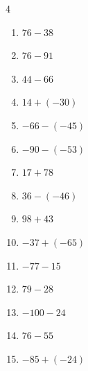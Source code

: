 \begin{multicols}{4}
\begin{enumerate}
        \phantom{$=54$}

  \item $76-38$

        \phantom{$=38$}

  \item $76-91$

        \phantom{$=-15$}

\columnbreak %

\resetques

  \item $44-66$

        \phantom{$=-22$}

  \item $14+(-30)$

        \phantom{$=-16$}

  \item $-66-(-45)$

        \phantom{$=-21$}

  \item $-90-(-53)$

        \phantom{$=-37$}

  \item $17+78$

        \phantom{$=95$}

  \item $36-(-46)$

        \phantom{$=82$}

  \item $98+43$

        \phantom{$=141$}

  \item $-37+(-65)$

        \phantom{$=-102$}

  \item $-77-15$

        \phantom{$=-92$}

  \item $79-28$

        \phantom{$=51$}

  \item $-100-24$

        \phantom{$=-124$}

  \item $76-55$

        \phantom{$=21$}

  \item $-85+(-24)$

        \phantom{$=-109$}


\end{enumerate}
\end{multicols}
